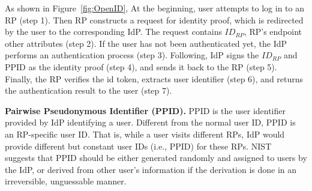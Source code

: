 As shown in Figure~\ref{fig:OpenID}, 
At the beginning, user attempts to log in to an RP (step 1). Then RP constructs a request for identity proof, which is redirected by the user to the corresponding IdP. The request contains $ID_{RP}$, RP's endpoint other attributes (step 2). If the user has not been authenticated yet, the IdP performs an authentication process (step 3). Following, IdP signs the $ID_{RP}$ and PPID as the identity proof (step 4), and sends it back to the RP (step 5). Finally, the RP verifies the id token, extracts user identifier (step 6), and returns the authentication result to the user (step 7).

\vspace{1mm}\noindent\textbf{Pairwise Pseudonymous Identifier (PPID).} 
PPID is the user identifier provided by IdP identifying a user. Different from the normal user ID, PPID is an RP-specific user ID. That is, while a user visits different RPs, IdP would provide different but constant user IDs (i.e., PPID) for these RPs.    
NIST~\cite{NIST2017draft} suggests that PPID should be either generated randomly and assigned to users by the IdP, or derived from other user's information if the derivation is done in an irreversible, unguessable manner. 


